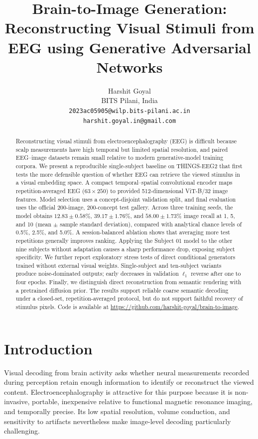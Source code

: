 \documentclass[10pt]{article}
\title{Brain-to-Image Generation: Reconstructing Visual Stimuli from EEG
using Generative Adversarial Networks}
\author{
  Harshit Goyal\\
  BITS Pilani, India\\
  \texttt{2023ac05905@wilp.bits-pilani.ac.in}\\
  \texttt{harshit.goyal.in@gmail.com}
}
\date{}
\begin{document}
\maketitle

\begin{abstract}
Reconstructing visual stimuli from electroencephalography (EEG) is difficult
because scalp measurements have high temporal but limited spatial resolution,
and paired EEG--image datasets remain small relative to modern generative-model
training corpora. We present a reproducible single-subject baseline on
THINGS-EEG2 that first tests the more defensible question of whether EEG can
retrieve the viewed stimulus in a visual embedding space. A compact
temporal--spatial convolutional encoder maps repetition-averaged EEG
($63\times250$) to provided 512-dimensional ViT-B/32 image features. Model
selection uses a concept-disjoint validation split, and final evaluation uses
the official 200-image, 200-concept test gallery. Across three training seeds, the model obtains
$12.83\pm0.58$\%, $39.17\pm1.76$\%, and $58.00\pm1.73$\% image recall at 1,
5, and 10 (mean $\pm$ sample standard deviation), compared with analytical
chance levels of 0.5\%, 2.5\%, and 5.0\%. A session-balanced ablation shows
that averaging more test repetitions generally improves ranking. Applying the
Subject 01 model to the other nine subjects without adaptation causes a sharp
performance drop, exposing subject specificity. We further report exploratory
stress tests of direct conditional generators trained without external visual
weights. Single-subject and ten-subject variants produce noise-dominated
outputs; early decreases in validation $\ell_1$ reverse after one to four
epochs. Finally, we distinguish direct reconstruction from semantic rendering
with a pretrained diffusion prior. The results support reliable coarse
semantic decoding under a closed-set, repetition-averaged protocol, but do not
support faithful recovery of stimulus pixels. Code is available at
\url{https://github.com/harshit-goyal/brain-to-image}.
\end{abstract}

\section{Introduction}

Visual decoding from brain activity asks whether neural measurements recorded
during perception retain enough information to identify or reconstruct the
viewed content. Electroencephalography is attractive for this purpose because
it is non-invasive, portable, inexpensive relative to functional magnetic
resonance imaging, and temporally precise. Its low spatial resolution, volume
conduction, and sensitivity to artifacts nevertheless make image-level
decoding particularly challenging.
\end{document}
